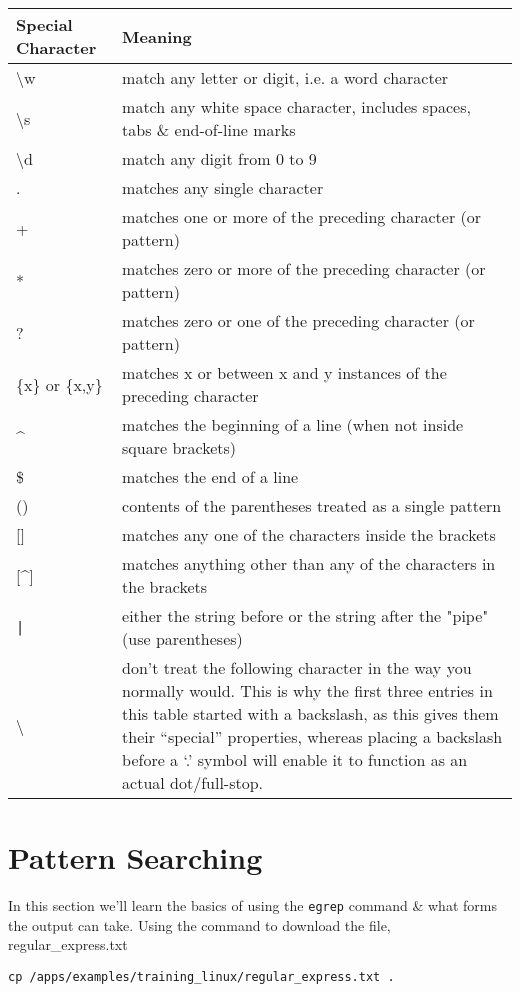 \begin{center}
\renewcommand{\arraystretch}{1.6}
\begin{tabular}{|p{4cm} | p{} |}
\hline
Special Character & Meaning \\ \hline
\textbackslash w & match any letter or digit, i.e. a word character \\
\textbackslash s & match any white space character, includes spaces,
tabs \& end-of-line marks \\
\textbackslash d & match any digit from 0 to 9 \\
. & matches any single character \\
+ & matches one or more of the preceding character (or pattern) \\
\** & matches zero or more of the preceding character (or pattern) \\
? & matches zero or one of the preceding character (or pattern) \\
\{x\} or \{x,y\} & matches x or between x and y instances of the preceding
character \\
\^{} & matches the beginning of a line (when not inside square brackets) \\
\$ & matches the end of a line \\
() & contents of the parentheses treated as a single pattern \\
{[}] & matches any one of the characters inside the brackets \\
{[}\^{}] & matches anything other than any of the characters in the brackets \\
\texttt{|} & either the string before or the string after the "pipe" (use parentheses) \\
\textbackslash & don't treat the following character in the way you normally would. This is why the first three entries in this table started with a backslash, as this gives them their ``special'' properties, whereas placing a backslash before a `.' symbol will enable it to function as an actual dot/full-stop. \\
\hline
\end{tabular}
\end{center}

\section{Pattern Searching}
In this section we'll learn the basics of using the \texttt{egrep} command \& what forms the output can take.
Using the command to download the file, regular\_express.txt
\begin{lstlisting}[style=command_syntax]
cp /apps/examples/training_linux/regular_express.txt .
\end{lstlisting}

